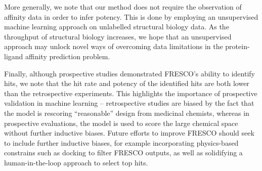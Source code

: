 More generally, we note that our method does not require the observation of affinity data in order to infer potency. This is done by employing an unsupervised machine learning approach on unlabelled structural biology data. As the throughput of structural biology increases, we hope that an unsupervised approach may unlock novel ways of overcoming data limitations in the protein-ligand affinity prediction problem.

Finally, although prospective studies demonstrated FRESCO's ability to identify hits, we note that the hit rate and potency of the identified hits are both lower than the retrospective experiments. This highlights the importance of prospective validation in machine learning -- retrospective studies are biased by the fact that the model is rescoring ``reasonable'' design from medicinal chemists, whereas in prospective evaluations, the model is used to score the large chemical space without further inductive biases. Future efforts to improve FRESCO should seek to include further inductive biases, for example incorporating physics-based constrains such as docking to filter FRESCO outputs, as well as solidifying a human-in-the-loop approach to select top hits. 

